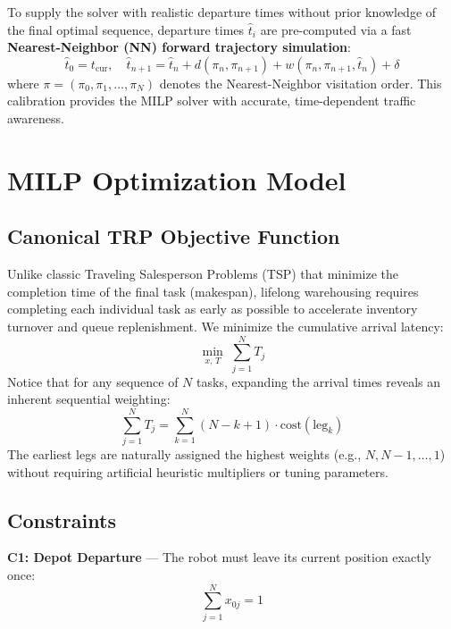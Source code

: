 \documentclass[10pt, twocolumn]{article}
\begin{document}
To supply the solver with realistic departure times without prior knowledge of the final optimal sequence, departure times $\hat{t}_i$ are pre-computed via a fast \textbf{Nearest-Neighbor (NN) forward trajectory simulation}:
\begin{equation}
  \hat{t}_0 = t_{\mathrm{cur}}, \quad
  \hat{t}_{n+1} = \hat{t}_n + d(\pi_n, \pi_{n+1}) + w(\pi_n,\pi_{n+1},\hat{t}_n) + \delta
  \label{eq:nn}
\end{equation}
where $\pi = (\pi_0, \pi_1, \ldots, \pi_N)$ denotes the Nearest-Neighbor visitation order. This calibration provides the MILP solver with accurate, time-dependent traffic awareness.

\section{MILP Optimization Model}

\subsection*{Canonical TRP Objective Function}
Unlike classic Traveling Salesperson Problems (TSP) that minimize the completion time of the final task (makespan), lifelong warehousing requires completing each individual task as early as possible to accelerate inventory turnover and queue replenishment. We minimize the cumulative arrival latency:
\begin{equation}
  \min_{x, \, T} \; \sum_{j=1}^{N} T_j
  \label{eq:obj}
\end{equation}
Notice that for any sequence of $N$ tasks, expanding the arrival times reveals an inherent sequential weighting:
\begin{equation}
  \sum_{j=1}^{N} T_j = \sum_{k=1}^{N} (N - k + 1) \cdot \text{cost}(\text{leg}_k)
\end{equation}
The earliest legs are naturally assigned the highest weights (e.g., $N, N-1, \ldots, 1$) without requiring artificial heuristic multipliers or tuning parameters.

\subsection*{Constraints}

\textbf{C1: Depot Departure} --- The robot must leave its current position exactly once:
\begin{equation}
  \sum_{j=1}^{N} x_{0j} = 1
  \label{eq:c1}
\end{equation}
\end{document}

